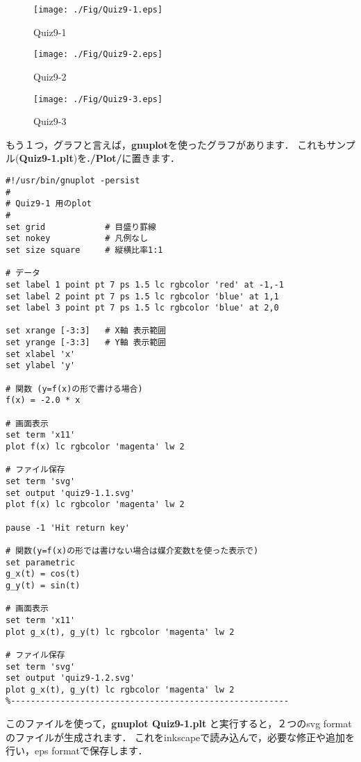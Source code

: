 \documentclass[12pt,a4j,dvipdfmx]{jarticle}
\begin{document}
\begin{figure}[htb]
    \begin{center}
    \texttt{[image: ./Fig/Quiz9-1.eps]} 
    \caption{Quiz9-1}                        
    \end{center}
\end{figure}
\begin{figure}[htb]
    \begin{center}
    \texttt{[image: ./Fig/Quiz9-2.eps]} 
    \caption{Quiz9-2}                        
    \end{center}
\end{figure}
\begin{figure}[htb]
    \begin{center}
    \texttt{[image: ./Fig/Quiz9-3.eps]} 
    \caption{Quiz9-3}                        
    \end{center}
\end{figure}
\clearpage
もう１つ，グラフと言えば，{\bf gnuplot}を使ったグラフがあります．
これもサンプル({\bf Quiz9-1.plt})を{\bf ./Plot/}に置きます．

\begin{lstlisting}[caption='Quiz9-1用gnuplot file', label=src:gnuplot]
%--------------------------------------------------------
#!/usr/bin/gnuplot -persist
#
# Quiz9-1 用のplot
#
set grid            # 目盛り罫線
set nokey           # 凡例なし
set size square     # 縦横比率1:1

# データ
set label 1 point pt 7 ps 1.5 lc rgbcolor 'red' at -1,-1
set label 2 point pt 7 ps 1.5 lc rgbcolor 'blue' at 1,1
set label 3 point pt 7 ps 1.5 lc rgbcolor 'blue' at 2,0

set xrange [-3:3]   # X軸 表示範囲
set yrange [-3:3]   # Y軸 表示範囲
set xlabel 'x'
set ylabel 'y'

# 関数 (y=f(x)の形で書ける場合)
f(x) = -2.0 * x

# 画面表示
set term 'x11'
plot f(x) lc rgbcolor 'magenta' lw 2

# ファイル保存
set term 'svg'
set output 'quiz9-1.1.svg'
plot f(x) lc rgbcolor 'magenta' lw 2

pause -1 'Hit return key'

# 関数(y=f(x)の形では書けない場合は媒介変数tを使った表示で)
set parametric
g_x(t) = cos(t)
g_y(t) = sin(t)

# 画面表示
set term 'x11'
plot g_x(t), g_y(t) lc rgbcolor 'magenta' lw 2

# ファイル保存
set term 'svg'
set output 'quiz9-1.2.svg'
plot g_x(t), g_y(t) lc rgbcolor 'magenta' lw 2
%--------------------------------------------------------
\end{lstlisting}
このファイルを使って，{\bf gnuplot Quiz9-1.plt} と実行すると，２つのsvg formatのファイルが生成されます．
これをinkscapeで読み込んで，必要な修正や追加を行い，eps formatで保存します．
\end{document}
